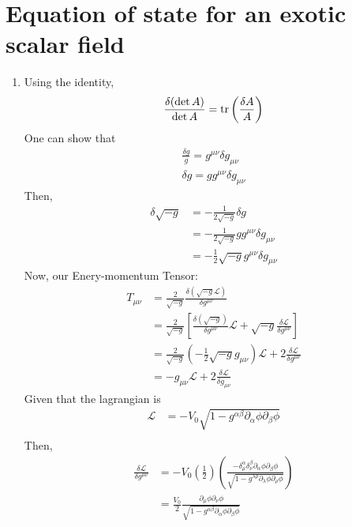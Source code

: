 \section{Equation of state for an exotic scalar field}
\newcommand{\Lagr}{\mathcal{L}}
\begin{enumerate}[label=(\alph*)]
	\item 
	Using the identity,
\begin{equation}
	\frac{\delta(\det A)}{\det A}  = \trace{\left(\frac{\delta A}{A}\right)}
\end{equation}
	One can show that 
\begin{align}
	\frac{\delta g}{g} = g^{\mu\nu} \delta g_{\mu\nu} \\
	\delta g = g g^{\mu\nu} \delta g_{\mu\nu} 
\end{align}
Then,
\begin{align}
	\delta \sqrt{-g} &= -\frac{1}{2 \sqrt{-g}} \delta g \\
				&= -\frac{1}{2 \sqrt{-g}} g g^{\mu\nu} \delta g_{\mu\nu} \\
				&= -\frac{1}{2} \sqrt{-g} g^{\mu\nu} \delta g_{\mu\nu} 
\end{align}
Now, our Enery-momentum Tensor:
\begin{align}
	T_{\mu\nu} 	&=  \frac{2}{\sqrt{-g}} \frac{\delta(\sqrt{-g}\mathcal{L})}{ \delta g^{\mu\nu}} \\
				&= \frac{2}{\sqrt{-g}} \left[ \frac{\delta(\sqrt{-g})}{\delta g^{\mu\nu}} \mathcal{L}+ \sqrt{-g}\frac{\delta\mathcal{L}}{\delta g^{\mu\nu}}  \right] \\
				&= \frac{2}{\sqrt{-g}} \left( -\frac{1}{2} \sqrt{-g} g_{\mu\nu} \right) \mathcal{L} + 2\frac{\delta \mathcal{L}}{\delta g^{\mu\nu}}  \\
				&= -g_{\mu\nu} \mathcal{L} + 2\frac{\delta\mathcal{L}}{\delta g_{\mu\nu}}  
\end{align}
Given that the lagrangian is \\
\begin{align}
		\Lagr &= -V_0 \sqrt{1-g^{\alpha\beta} \partial_\alpha \phi \partial_\beta \phi } \\
\end{align}
Then,
\begin{align}
\frac{\delta\mathcal{L}}{\delta g^{\mu\nu}} &= -V_0 \left(\frac{1}{2}\right) \left( \frac{-\delta^\alpha_\mu \delta^\beta_\nu \partial_\alpha \phi \partial_\beta \phi}{\sqrt{1-g^{\lambda\rho} \partial_\lambda\phi \partial_\rho\phi }} \right) \\
									&= \frac{V_0}{2} \frac{\partial_\mu \phi \partial_\nu \phi}{\sqrt{1-g^{\alpha\beta} \partial_\alpha \phi \partial_\beta \phi }}
\end{align}


\end{enumerate}
